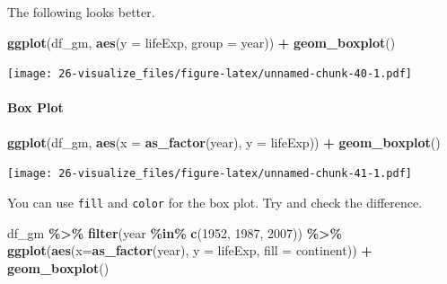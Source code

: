 \documentclass[
  xelatex, ja=standard]{bxjsbook}
\newenvironment{Shaded}{\begin{snugshade}}{\end{snugshade}}
\newcommand{\AttributeTok}[1]{\textcolor[rgb]{0.13,0.29,0.53}{#1}}
\newcommand{\CommentTok}[1]{\textcolor[rgb]{0.56,0.35,0.01}{\textit{#1}}}
\newcommand{\DecValTok}[1]{\textcolor[rgb]{0.00,0.00,0.81}{#1}}
\newcommand{\FunctionTok}[1]{\textcolor[rgb]{0.13,0.29,0.53}{\textbf{#1}}}
\newcommand{\NormalTok}[1]{#1}
\newcommand{\SpecialCharTok}[1]{\textcolor[rgb]{0.81,0.36,0.00}{\textbf{#1}}}
\theoremstyle{definition}
\theoremstyle{definition}
\theoremstyle{definition}
\theoremstyle{definition}
\theoremstyle{remark}
\begin{document}
\begin{Shaded}
\end{Shaded}

The following looks better.

\begin{Shaded}
\begin{Highlighting}[]
\FunctionTok{ggplot}\NormalTok{(df\_gm, }\FunctionTok{aes}\NormalTok{(}\AttributeTok{y =}\NormalTok{ lifeExp, }\AttributeTok{group =}\NormalTok{ year)) }\SpecialCharTok{+} \FunctionTok{geom\_boxplot}\NormalTok{()}
\end{Highlighting}
\end{Shaded}

\texttt{[image: 26-visualize\_files/figure-latex/unnamed-chunk-40-1.pdf]}

\hypertarget{box-plot}{%
\paragraph{Box Plot}\label{box-plot}}

\begin{Shaded}
\begin{Highlighting}[]
\FunctionTok{ggplot}\NormalTok{(df\_gm, }\FunctionTok{aes}\NormalTok{(}\AttributeTok{x =} \FunctionTok{as\_factor}\NormalTok{(year), }\AttributeTok{y =}\NormalTok{ lifeExp)) }\SpecialCharTok{+} \FunctionTok{geom\_boxplot}\NormalTok{()}
\end{Highlighting}
\end{Shaded}

\texttt{[image: 26-visualize\_files/figure-latex/unnamed-chunk-41-1.pdf]}

You can use \texttt{fill} and \texttt{color} for the box plot. Try and check the difference.

\begin{Shaded}
\begin{Highlighting}[]
\NormalTok{df\_gm }\SpecialCharTok{\%\textgreater{}\%} \FunctionTok{filter}\NormalTok{(year }\SpecialCharTok{\%in\%} \FunctionTok{c}\NormalTok{(}\DecValTok{1952}\NormalTok{, }\DecValTok{1987}\NormalTok{, }\DecValTok{2007}\NormalTok{)) }\SpecialCharTok{\%\textgreater{}\%}
  \FunctionTok{ggplot}\NormalTok{(}\FunctionTok{aes}\NormalTok{(}\AttributeTok{x=}\FunctionTok{as\_factor}\NormalTok{(year), }\AttributeTok{y =}\NormalTok{ lifeExp, }\AttributeTok{fill =}\NormalTok{ continent)) }\SpecialCharTok{+}
  \FunctionTok{geom\_boxplot}\NormalTok{()}
\end{Highlighting}
\end{Shaded}
\end{document}
